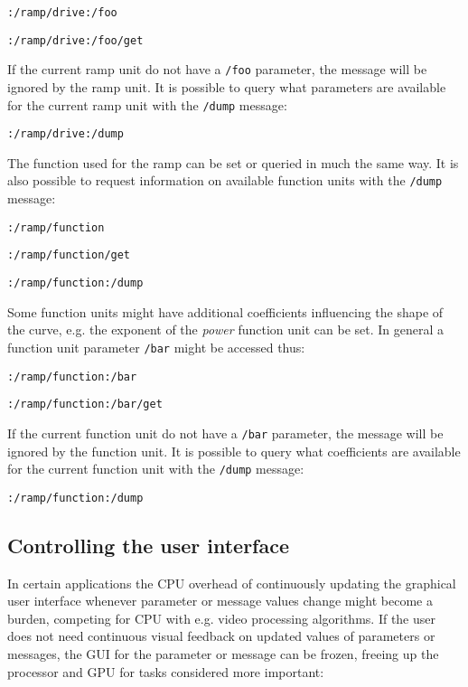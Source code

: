 \documentclass{NIME-alternate}
\begin{document}
\texttt{:/ramp/drive:/foo}

\texttt{:/ramp/drive:/foo/get}

If the current ramp unit do not have a \texttt{/foo} parameter, the message will be ignored by the ramp unit. It is possible to query what parameters are available for the current ramp unit with the \texttt{/dump} message:

\texttt{:/ramp/drive:/dump}

The function used for the ramp can be set or queried in much the same way. It is also possible to request information on available function units with the \texttt{/dump} message:

\texttt{:/ramp/function}

\texttt{:/ramp/function/get}

\texttt{:/ramp/function:/dump}

Some function units might have additional coefficients influencing the shape of the curve, e.g. the exponent of the \emph{power} function unit can be set. In general a function unit parameter \texttt{/bar} might be accessed thus:

\texttt{:/ramp/function:/bar}

\texttt{:/ramp/function:/bar/get}

If the current function unit do not have a \texttt{/bar} parameter, the message will be ignored by the function unit. It is possible to query what coefficients are available for the current function unit with the \texttt{/dump} message:

\texttt{:/ramp/function:/dump}





\subsection{Controlling the user interface} %
\label{sub:controlling_the_user_interface}

In certain applications the CPU overhead of continuously updating the graphical user interface whenever parameter or message values change might become a burden, competing for CPU with e.g. video processing algorithms. If the user does not need continuous visual feedback on updated values of parameters or messages, the GUI for the parameter or message can be frozen, freeing up the processor and GPU for tasks considered more important:
\end{document}
